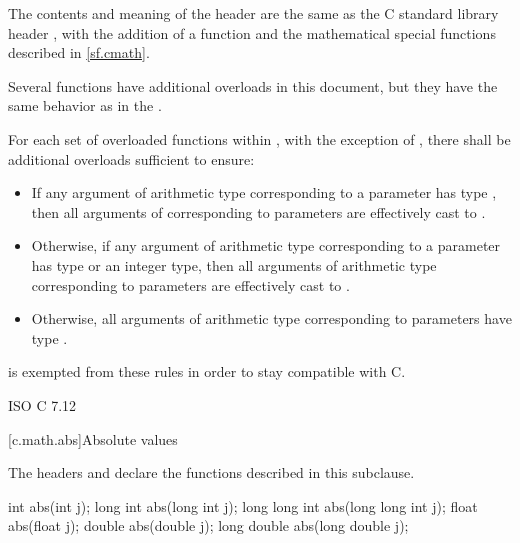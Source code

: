 \pnum
The contents and meaning of the header 
are the same as the C standard library header ,
with the addition of
a  function and
the mathematical special functions described in \ref{sf.cmath}.
\begin{note}
Several functions have additional overloads in this document,
but they have the same behavior as in the .
\end{note}

\pnum
For each set of overloaded functions within ,
with the exception of ,
there shall be additional overloads sufficient to ensure:
\begin{itemize}
  \item If any argument of arithmetic type
    corresponding to a  parameter
    has type ,
    then all arguments of 
    corresponding to  parameters
    are effectively cast to .
  \item Otherwise, if any argument of arithmetic type
    corresponding to a  parameter
    has type 
    or an integer type,
    then all arguments of arithmetic type
    corresponding to  parameters
    are effectively cast to .
  \item
\begin{note}
Otherwise, all arguments of arithmetic type
corresponding to  parameters
have type .
\end{note}
\end{itemize}
\begin{note}
 is exempted from these rules in order to stay compatible with C.
\end{note}

\xref
ISO C 7.12

[c.math.abs]{Absolute values}

\pnum
\begin{note}
The headers  and
declare the functions described in this subclause.
\end{note}

%
\begin{itemdecl}
int abs(int j);
long int abs(long int j);
long long int abs(long long int j);
float abs(float j);
double abs(double j);
long double abs(long double j);
\end{itemdecl}

